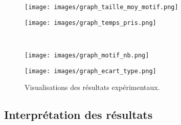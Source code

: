 \documentclass[a4paper,12pt]{article}
\begin{document}
\begin{figure}[ht]
\centering
\begin{minipage}[b]{0.48\textwidth}
    \centering
    \texttt{[image: images/graph\_taille\_moy\_motif.png]}
    \label{fig:vis1}
\end{minipage}
\hfill
\begin{minipage}[b]{0.48\textwidth}
    \centering
    \texttt{[image: images/graph\_temps\_pris.png]}
    \label{fig:vis2}
\end{minipage}
\\
\begin{minipage}[b]{0.48\textwidth}
    \centering
    \texttt{[image: images/graph\_motif\_nb.png]}
    \label{fig:vis3}
\end{minipage}
\hfill
\begin{minipage}[b]{0.48\textwidth}
    \centering
    \texttt{[image: images/graph\_ecart\_type.png]}
    \label{fig:vis4}
\end{minipage}

\caption{Visualisations des résultats expérimentaux.}
\label{fig:visualisations}
\end{figure}




\subsection{Interprétation des résultats}
\end{document}
